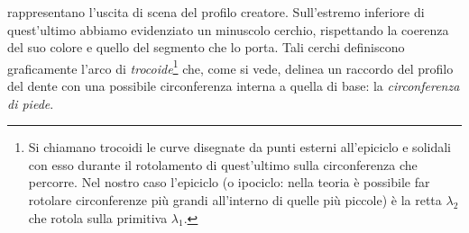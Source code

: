 rappresentano l'uscita di scena del profilo creatore. Sull'estremo inferiore
di quest'ultimo abbiamo evidenziato un minuscolo cerchio, rispettando la coerenza
del suo colore e quello del segmento che lo porta. Tali cerchi definiscono graficamente
l'arco di {\em trocoide}\footnote{
Si chiamano trocoidi le curve disegnate da punti esterni all'epiciclo
e solidali con esso durante il
rotolamento di quest'ultimo sulla circonferenza che percorre. Nel nostro caso
l'epiciclo (o ipociclo: nella teoria \`e possibile far rotolare circonferenze
pi\`u grandi all'interno di quelle pi\`u piccole) 
\`e la retta $\lambda_2$ che rotola sulla primitiva $\lambda_1$.
} che, come si vede, delinea un raccordo del profilo del dente con una
possibile circonferenza interna a quella di base: la {\em circonferenza
di piede}.

